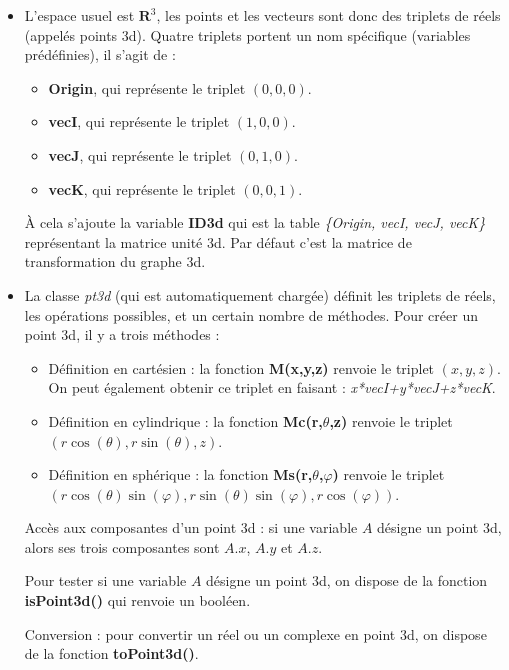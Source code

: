 \documentclass[%
10pt,%
a4paper,%
french,%
]%
{article}%
\begin{document}
\begin{itemize}
    \item L'espace usuel est $\mathbf R^3$, les points et les vecteurs sont donc des triplets de réels (appelés points 3d). Quatre triplets portent un nom spécifique (variables prédéfinies), il s'agit de :
    \begin{itemize}
        \item \textbf{Origin}, qui représente le triplet $(0,0,0)$.
        \item \textbf{vecI}, qui représente le triplet $(1,0,0)$.
        \item \textbf{vecJ}, qui représente le triplet $(0,1,0)$.
        \item \textbf{vecK}, qui représente le triplet $(0,0,1)$.
    \end{itemize}
    À cela s'ajoute la variable \textbf{ID3d} qui est la table \emph{\{Origin, vecI, vecJ, vecK\}} représentant la matrice unité 3d. Par défaut c'est la matrice de transformation du graphe 3d.
    \item La classe \emph{pt3d} (qui est automatiquement chargée) définit les triplets de réels, les opérations possibles, et un certain nombre de méthodes. Pour créer un point 3d, il y a trois méthodes :
        \begin{itemize}
            \item Définition en cartésien : la fonction \textbf{M(x,y,z)} renvoie le triplet $(x,y,z)$. On peut également obtenir ce triplet en faisant : \emph{x*vecI+y*vecJ+z*vecK}.
            \item Définition en cylindrique : la fonction \textbf{Mc(r,$\theta$,z)} renvoie le triplet $(r\cos(\theta),r\sin(\theta),z)$.
            \item Définition en sphérique : la fonction \textbf{Ms(r,$\theta$,$\varphi$)} renvoie le triplet $(r\cos(\theta)\sin(\varphi), r\sin(\theta)\sin(\varphi),r\cos(\varphi))$.
        \end{itemize}
    Accès aux composantes d'un point 3d : si une variable $A$ désigne un point 3d, alors ses trois composantes sont $A.x$, $A.y$ et $A.z$.
    
    Pour tester si une variable $A$ désigne un point 3d, on dispose de la fonction \textbf{isPoint3d()} qui renvoie un booléen.
    
    Conversion : pour convertir un réel ou un complexe en point 3d, on dispose de la fonction \textbf{toPoint3d()}.
\end{itemize}
\end{document}
